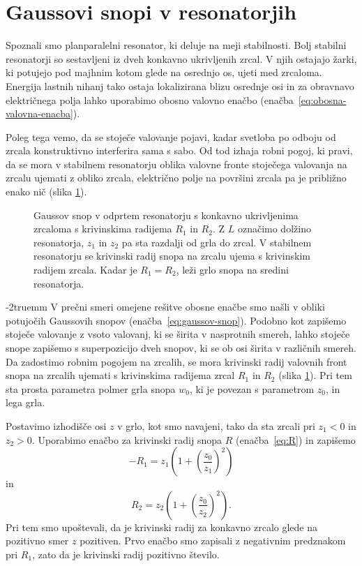 \section{Gaussovi snopi v resonatorjih}
Spoznali smo planparalelni resonator, ki deluje na meji stabilnosti. 
Bolj stabilni resonatorji so sestavljeni iz dveh konkavno ukrivljenih
zrcal. V njih ostajajo žarki, ki potujejo pod majhnim kotom glede na osrednjo os, ujeti
med zrcaloma. Energija lastnih nihanj tako ostaja lokalizirana blizu osrednje osi in za obravnavo
električnega polja lahko uporabimo obosno valovno 
enačbo (enačba~\ref{eq:obosna-valovna-enacba}). 

Poleg tega vemo, da se stoječe valovanje pojavi, kadar
svetloba po odboju od zrcala konstruktivno interferira sama s sabo.
Od tod izhaja robni pogoj, ki pravi, da se mora v stabilnem resonatorju 
oblika valovne fronte stoječega valovanja na 
zrcalu ujemati z obliko zrcala, električno polje na površini zrcala
pa je približno enako nič (slika \ref{fig:Gaussov-snop-v-resonatorju}).
\begin{figure}[ht]
\centering
\def\svgwidth{90truemm} 

\caption{Gaussov snop v odprtem resonatorju s konkavno ukrivljenima zrcaloma
s krivinskima radijema $R_1$ in $R_2$. Z $L$ označimo dolžino resonatorja,
$z_1$ in $z_2$ pa sta razdalji od grla do zrcal. V stabilnem resonatorju se krivinski 
radij snopa na zrcalu ujema s krivinskim radijem zrcala. Kadar je $R_1 = R_2$, 
leži grlo snopa na sredini resonatorja. }
\label{fig:Gaussov-snop-v-resonatorju}
\end{figure}
\vglue-2truemm
V prečni smeri omejene rešitve obosne enačbe smo našli v obliki potujočih
Gaussovih snopov (enačba~\ref{eq:gaussov-snop}). 
Podobno kot zapišemo stoječe valovanje z vsoto valovanj, ki se širita v nasprotnih smereh,
lahko stoječe snope zapišemo s superpozicijo dveh snopov, ki se ob osi širita v različnih smereh. 
Da zadostimo robnim pogojem na zrcalih, se mora krivinski radij valovnih front 
snopa na zrcalih ujemati s krivinskima radijema zrcal $R_{1}$ in $R_{2}$ 
(slika \ref{fig:Gaussov-snop-v-resonatorju}).
Pri tem sta prosta parametra polmer grla snopa $w_0$, 
ki je povezan s parametrom $z_{0}$, in lega grla. 

Postavimo izhodišče osi $z$ v grlo, kot smo
navajeni, tako da sta zrcali pri $z_{1}<0$ in $z_{2}>0$. Uporabimo enačbo
za krivinski radij snopa $R$ (enačba~\ref{eq:R})  in zapišemo 
\begin{equation}
-R_{1}  =  z_{1}\left(1+\left(\frac{z_{0}}{z_{1}}\right)^{2}\right)
\label{eq:krivinski1} 
\end{equation}
in
\begin{equation}
R_{2}  =  z_{2}\left(1+\left(\frac{z_{0}}{z_{2}}\right)^{2}\right)\!\!.
\label{eq:krivinski}
\end{equation}
Pri tem smo upoštevali, da je krivinski radij za konkavno zrcalo glede na 
pozitivno smer $z$ pozitiven. Prvo enačbo smo zapisali z negativnim 
predznakom pri $R_1$, zato da je krivinski radij pozitivno število.

